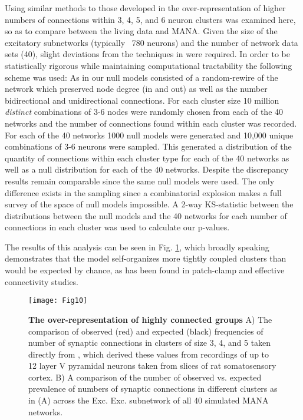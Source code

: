 \documentclass[10pt,letterpaper]{article}
\begin{document}
Using similar methods to those developed in \cite{perin2011synaptic} the over-representation of higher numbers of connections within 3, 4, 5, and 6 neuron clusters was examined here, so as to compare between the living data and MANA. Given the size of the excitatory subnetworks (typically ~780 neurons) and the number of network data sets (40), slight deviations from the techniques in \cite{perin2011synaptic} were required. In order to be statistically rigorous while maintaining computational tractability the following scheme was used: As in \cite{perin2011synaptic} our null models consisted of a random-rewire of the network which preserved node degree (in and out) as well as the number bidirectional and unidirectional connections. For each cluster size 10 million \emph{distinct} combinations of 3-6 nodes were randomly chosen from each of the 40 networks and the number of connections found within each cluster was recorded. For each of the 40 networks 1000 null models were generated and 10,000 unique combinations of 3-6 neurons were sampled. This generated a distribution of the quantity of connections within each cluster type for each of the 40 networks as well as a null distribution for each of the 40 networks. Despite the discrepancy results remain comparable since the same null models were used. The only difference exists in the sampling since a combinatorial explosion makes a full survey of the space of null models impossible. A 2-way KS-statistic between the distributions between the null models and the 40 networks for each number of connections in each cluster was used to calculate our p-values.

The results of this analysis can be seen in Fig. \ref{Fig10}, which broadly speaking demonstrates that the model self-organizes more tightly coupled clusters than would be expected by chance, as has been found in patch-clamp \cite{perin2011synaptic} and effective connectivity \cite{shimono2015functional} studies.

\begin{figure}[!h]
	\centering
	\texttt{[image: Fig10]}
	\caption{{\bf The over-representation of highly connected groups}
		A) The comparison of observed (red) and expected (black) frequencies of number of synaptic connections in clusters of size 3, 4, and 5 taken directly from \cite{perin2011synaptic}, which derived these values from recordings of up to 12 layer V pyramidal neurons taken from slices of rat somatosensory cortex. B) A comparison of the number of observed vs. expected prevalence of numbers of synaptic connections in different clusters as in (A) across the Exc. \textrightarrow Exc. subnetwork of all 40 simulated MANA networks.}
	\label{Fig10}
\end{figure}
\end{document}
